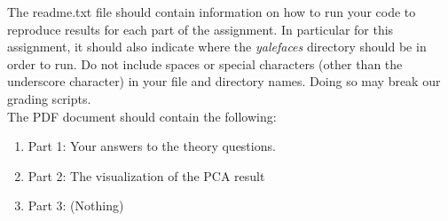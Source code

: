 \documentclass[12pt]{article}
\begin{document}
\noindent
The readme.txt file should contain information on how to run your code to reproduce results for each part of the assignment.  In particular for this assignment, it should also indicate where the \emph{yalefaces} directory should be in order to run.  Do not include spaces or special characters (other than the underscore character) in your file and directory names.  Doing so may break our grading scripts.\\

\noindent
The PDF document should contain the following:
\begin{enumerate}
\item Part 1: Your answers to the theory questions.
\item Part 2: The visualization of the PCA result
\item Part 3: (Nothing)
\end{enumerate}
\end{document}
